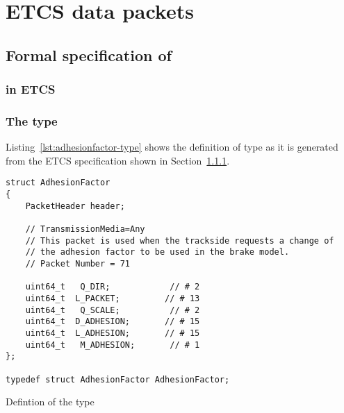 

\chapter{ETCS data packets}
\label{sec:packets}

\section{Formal specification of }
\label{sec:adhesionfactor}

\subsection{ in ETCS}
\label{sec:adhesionfactor-etcs}


\subsection{The type }
\label{sec:adhesionfactor-type}

Listing~\ref{lst:adhesionfactor-type} shows the definition of type
\adhesion as it is generated from the ETCS specification shown in Section~\ref{sec:adhesionfactor-etcs}.

\begin{listing}[hbt]
\begin{minipage}{0.99\textwidth}
\begin{lstlisting}[style=acsl-block]
struct AdhesionFactor
{
    PacketHeader header;

    // TransmissionMedia=Any
    // This packet is used when the trackside requests a change of
    // the adhesion factor to be used in the brake model.
    // Packet Number = 71

    uint64_t   Q_DIR;            // # 2
    uint64_t  L_PACKET;         // # 13
    uint64_t   Q_SCALE;          // # 2
    uint64_t  D_ADHESION;       // # 15
    uint64_t  L_ADHESION;       // # 15
    uint64_t   M_ADHESION;       // # 1
};

typedef struct AdhesionFactor AdhesionFactor;

\end{lstlisting}
\end{minipage}
\caption{\label{lst:adhesionfactor-type}Defintion of the type \adhesion}
\end{listing}

\FloatBarrier  %

